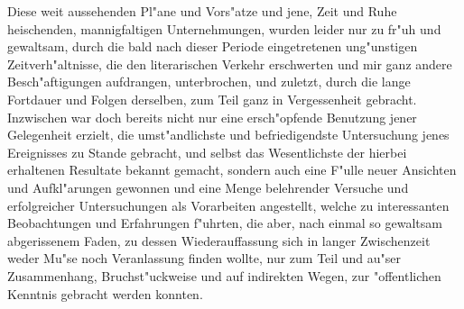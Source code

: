 \documentclass[a4paper, 11pt, oneside, german]{article}
\begin{document}
Diese weit aussehenden Pl"ane und Vors"atze und jene, Zeit und Ruhe heischenden, mannigfaltigen Unternehmungen, wurden leider nur zu fr"uh und gewaltsam, durch die bald nach dieser Periode eingetretenen ung"unstigen Zeitverh"altnisse, die den literarischen Verkehr erschwerten und mir ganz andere Besch"aftigungen aufdrangen, unterbrochen, und zuletzt, durch die lange Fortdauer und Folgen derselben, zum Teil ganz in Vergessenheit gebracht. Inzwischen war doch bereits nicht nur eine ersch"opfende Benutzung jener Gelegenheit erzielt, die umst"andlichste und befriedigendste Untersuchung jenes Ereignisses zu Stande gebracht, und selbst das Wesentlichste der hierbei erhaltenen Resultate bekannt gemacht, sondern auch eine F"ulle neuer Ansichten und Aufkl"arungen gewonnen und eine Menge belehrender Versuche und erfolgreicher Untersuchungen als Vorarbeiten angestellt, welche zu interessanten Beobachtungen und Erfahrungen f"uhrten, die aber, nach einmal so gewaltsam abgerissenem Faden, zu dessen Wiederauffassung sich in langer Zwischenzeit weder Mu"se noch Veranlassung finden wollte, nur zum Teil und au"ser Zusammenhang, Bruchst"uckweise und auf indirekten Wegen, zur "offentlichen Kenntnis gebracht werden konnten.
\end{document}
